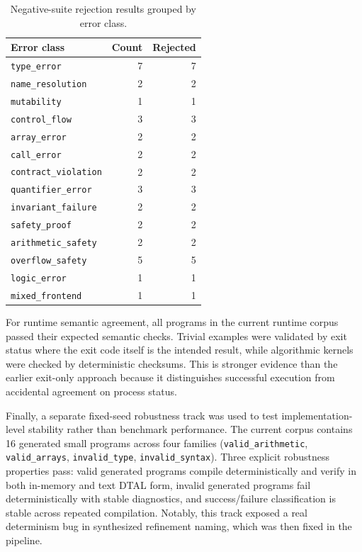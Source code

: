 \begin{table}[h]
  \centering
  \small
  \begin{tabular}{l r r}
    \hline
    \textbf{Error class}         & \textbf{Count} & \textbf{Rejected} \\
    \hline
    \texttt{type\_error}         & 7              & 7                 \\
    \texttt{name\_resolution}    & 2              & 2                 \\
    \texttt{mutability}          & 1              & 1                 \\
    \texttt{control\_flow}       & 3              & 3                 \\
    \texttt{array\_error}        & 2              & 2                 \\
    \texttt{call\_error}         & 2              & 2                 \\
    \texttt{contract\_violation} & 2              & 2                 \\
    \texttt{quantifier\_error}   & 3              & 3                 \\
    \texttt{invariant\_failure}  & 2              & 2                 \\
    \texttt{safety\_proof}       & 2              & 2                 \\
    \texttt{arithmetic\_safety}  & 2              & 2                 \\
    \texttt{overflow\_safety}    & 5              & 5                 \\
    \texttt{logic\_error}        & 1              & 1                 \\
    \texttt{mixed\_frontend}     & 1              & 1                 \\
    \hline
  \end{tabular}
  \caption{Negative-suite rejection results grouped by error class.}
  \label{tab:error-classes}
\end{table}

For runtime semantic agreement, all programs in the current runtime corpus
passed their expected semantic checks. Trivial examples were validated by exit
status where the exit code itself is the intended result, while algorithmic
kernels were checked by deterministic checksums. This is stronger evidence than
the earlier exit-only approach because it distinguishes successful execution
from accidental agreement on process status.

Finally, a separate fixed-seed robustness track was used to test
implementation-level stability rather than benchmark performance. The current
corpus contains 16 generated small programs across four families
(\texttt{valid\_arithmetic}, \texttt{valid\_arrays}, \texttt{invalid\_type},
\texttt{invalid\_syntax}). Three explicit robustness properties pass: valid
generated programs compile deterministically and verify in both in-memory and
text DTAL form, invalid generated programs fail deterministically with stable
diagnostics, and success/failure classification is stable across repeated
compilation. Notably, this track exposed a real determinism bug in synthesized
refinement naming, which was then fixed in the pipeline.

